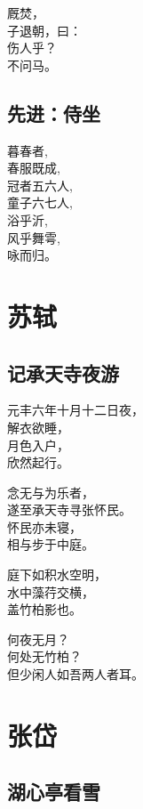 \documentclass[]{book}
\renewenvironment{quote}{\begin{VF}}{\end{VF}}
\begin{document}
\begin{quote}
厩焚，\\
子退朝，曰：\\
伤人乎？\\
不问马。
\end{quote}

\section{先进：侍坐}

\begin{quote}
暮春者,\\
春服既成,\\
冠者五六人,\\
童子六七人,\\
浴乎沂,\\
风乎舞雩,\\
咏而归。
\end{quote}

\chapter{苏轼}

\section{记承天寺夜游}

\begin{quote}
元丰六年十月十二日夜，\\
解衣欲睡，\\
月色入户，\\
欣然起行。

念无与为乐者，\\
遂至承天寺寻张怀民。\\
怀民亦未寝，\\
相与步于中庭。

庭下如积水空明，\\
水中藻荇交横，\\
盖竹柏影也。

何夜无月？\\
何处无竹柏？\\
但少闲人如吾两人者耳。
\end{quote}

\chapter{张岱}

\section{湖心亭看雪}
\end{document}

